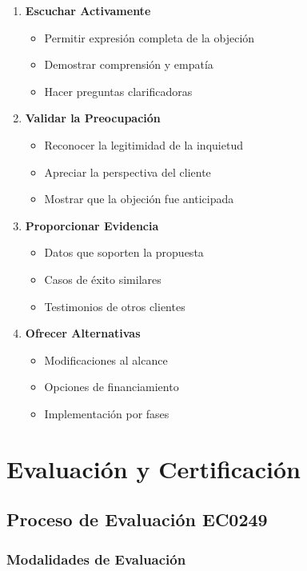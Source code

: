 \documentclass[12pt,letterpaper,oneside]{book}
\begin{document}
\begin{enumerate}
\item \textbf{Escuchar Activamente}
   \begin{itemize}
   \item Permitir expresión completa de la objeción
   \item Demostrar comprensión y empatía
   \item Hacer preguntas clarificadoras
   \end{itemize}

\item \textbf{Validar la Preocupación}
   \begin{itemize}
   \item Reconocer la legitimidad de la inquietud
   \item Apreciar la perspectiva del cliente
   \item Mostrar que la objeción fue anticipada
   \end{itemize}

\item \textbf{Proporcionar Evidencia}
   \begin{itemize}
   \item Datos que soporten la propuesta
   \item Casos de éxito similares
   \item Testimonios de otros clientes
   \end{itemize}

\item \textbf{Ofrecer Alternativas}
   \begin{itemize}
   \item Modificaciones al alcance
   \item Opciones de financiamiento
   \item Implementación por fases
   \end{itemize}
\end{enumerate}

\chapter{Evaluación y Certificación}

\section{Proceso de Evaluación EC0249}

\subsection{Modalidades de Evaluación}
\end{document}
